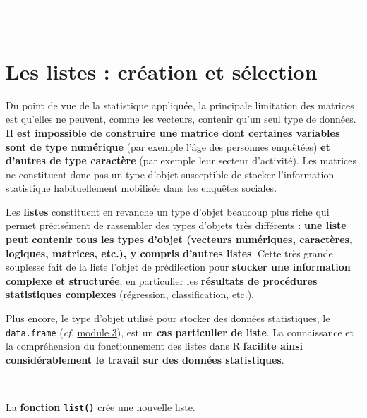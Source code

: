 \documentclass[12pt,twosided, notitlepage]{book}
\begin{document}
\begin{enumerate}
  \begin{center} \rule{0.5\linewidth}{\linethickness}\end{center}

  \bigskip  \fi 
\end{enumerate}

~

\section{Les listes : création et
sélection}\label{les-listes-creation-et-selection}

Du point de vue de la statistique appliquée, la principale limitation
des matrices est qu'elles ne peuvent, comme les vecteurs, contenir qu'un
seul type de données. \textbf{Il est impossible de construire une
matrice dont certaines variables sont de type numérique} (par exemple
l'âge des personnes enquêtées) \textbf{et d'autres de type caractère}
(par exemple leur secteur d'activité). Les matrices ne constituent donc
pas un type d'objet susceptible de stocker l'information statistique
habituellement mobilisée dans les enquêtes sociales.

Les \textbf{listes} constituent en revanche un type d'objet beaucoup
plus riche qui permet précisément de rassembler des types d'objets très
différents : \textbf{une liste peut contenir tous les types d'objet
(vecteurs numériques, caractères, logiques, matrices, etc.), y compris
d'autres listes}. Cette très grande souplesse fait de la liste l'objet
de prédilection pour \textbf{stocker une information complexe et
structurée}, en particulier les \textbf{résultats de procédures
statistiques complexes} (régression, classification, etc.).

Plus encore, le type d'objet utilisé pour stocker des données
statistiques, le \texttt{data.frame} (\emph{cf.} \underline{module 3}),
est un \textbf{cas particulier de liste}. La connaissance et la
compréhension du fonctionnement des listes dans R \textbf{facilite ainsi
considérablement le travail sur des données statistiques}.

~

La \textbf{fonction \texttt{list()}} crée
une nouvelle liste.
\end{document}
